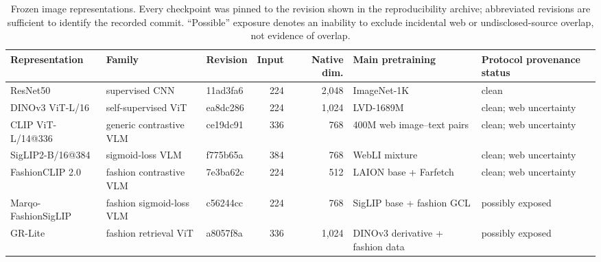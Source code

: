 \begin{table}[t]
\caption{Frozen image representations. Every checkpoint was pinned to the revision shown in the reproducibility archive; abbreviated revisions are sufficient to identify the recorded commit. ``Possible'' exposure denotes an inability to exclude incidental web or undisclosed-source overlap, not evidence of overlap.}
\label{tab:representations}
\centering
\scriptsize
\begin{tabular}{l l l r r l l}
\toprule
Representation & Family & Revision & Input & Native dim. & Main pretraining & Protocol provenance status \\
\midrule
ResNet50 & supervised CNN & 11ad3fa6 & 224 & 2,048 & ImageNet-1K & clean \\
DINOv3 ViT-L/16 & self-supervised ViT & ea8dc286 & 224 & 1,024 & LVD-1689M & clean; web uncertainty \\
CLIP ViT-L/14@336 & generic contrastive VLM & ce19dc91 & 336 & 768 & 400M web image--text pairs & clean; web uncertainty \\
SigLIP2-B/16@384 & sigmoid-loss VLM & f775b65a & 384 & 768 & WebLI mixture & clean; web uncertainty \\
FashionCLIP 2.0 & fashion contrastive VLM & 7e3ba62c & 224 & 512 & LAION base + Farfetch & clean; web uncertainty \\
Marqo-FashionSigLIP & fashion sigmoid-loss VLM & c56244cc & 224 & 768 & SigLIP base + fashion GCL & possibly exposed \\
GR-Lite & fashion retrieval ViT & a8057f8a & 336 & 1,024 & DINOv3 derivative + fashion data & possibly exposed \\
\bottomrule
\end{tabular}
\end{table}

